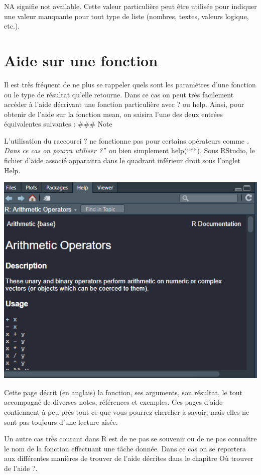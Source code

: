 \documentclass[
]{book}
\begin{document}
NA signifie not available. Cette valeur particulière peut être utilisée pour indiquer une valeur manquante pour tout type de liste (nombres, textes, valeurs logique, etc.).

\hypertarget{aide-sur-une-fonction}{%
\section{Aide sur une fonction}\label{aide-sur-une-fonction}}

Il est très fréquent de ne plus se rappeler quels sont les paramètres d'une fonction ou le type de résultat qu'elle retourne. Dans ce cas on peut très facilement accéder à l'aide décrivant une fonction particulière avec ? ou help. Ainsi, pour obtenir de l'aide sur la fonction mean, on saisira l'une des deux entrées équivalentes suivantes :
\#\#\# Note

L'utilisation du raccourci ? ne fonctionne pas pour certains opérateurs comme \emph{. Dans ce cas on pourra utiliser ?'}' ou bien simplement help(``*``).
Sous RStudio, le fichier d'aide associé apparaitra dans le quadrant inférieur droit sous l'onglet Help.

\includegraphics[width=1\linewidth]{images/aide}

Cette page décrit (en anglais) la fonction, ses arguments, son résultat, le tout accompagné de diverses notes, références et exemples. Ces pages d'aide contiennent à peu près tout ce que vous pourrez chercher à savoir, mais elles ne sont pas toujours d'une lecture aisée.

Un autre cas très courant dans R est de ne pas se souvenir ou de ne pas connaître le nom de la fonction effectuant une tâche donnée. Dans ce cas on se reportera aux différentes manières de trouver de l'aide décrites dans le chapitre Où trouver de l'aide ?.
\end{document}
